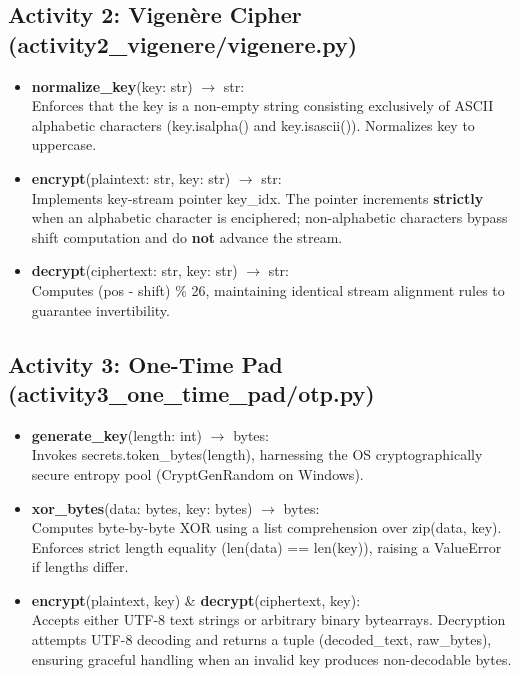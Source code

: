 \documentclass[12pt,a4paper]{report}
\renewcommand{\texttt}[1]{{\normalfont #1}}
\begin{document}
\subsection{Activity 2: Vigen\`ere Cipher (\texttt{activity2\_vigenere/\allowbreak vigenere.py})}
\begin{itemize}[leftmargin=1.5em]
    \item \textbf{\texttt{normalize\_key}}(\texttt{key: str}) $\to$ \texttt{str}:\\[2pt]
    Enforces that the key is a non-empty string consisting exclusively of ASCII alphabetic characters (\texttt{key.isalpha() and key.isascii()}). Normalizes key to uppercase.
    \item \textbf{\texttt{encrypt}}(\texttt{plaintext: str, key: str}) $\to$ \texttt{str}:\\[2pt]
    Implements key-stream pointer \texttt{key\_idx}. The pointer increments \textbf{strictly} when an alphabetic character is enciphered; non-alphabetic characters bypass shift computation and do \textbf{not} advance the stream.
    \item \textbf{\texttt{decrypt}}(\texttt{ciphertext: str, key: str}) $\to$ \texttt{str}:\\[2pt]
    Computes \texttt{(pos - shift) \% 26}, maintaining identical stream alignment rules to guarantee invertibility.
\end{itemize}

\subsection{Activity 3: One-Time Pad (\texttt{activity3\_one\_time\_pad/\allowbreak otp.py})}
\begin{itemize}[leftmargin=1.5em]
    \item \textbf{\texttt{generate\_key}}(\texttt{length: int}) $\to$ \texttt{bytes}:\\[2pt]
    Invokes \texttt{secrets.token\_bytes(length)}, harnessing the OS cryptographically secure entropy pool (CryptGenRandom on Windows).
    \item \textbf{\texttt{xor\_bytes}}(\texttt{data: bytes, key: bytes}) $\to$ \texttt{bytes}:\\[2pt]
    Computes byte-by-byte XOR using a list comprehension over \texttt{zip(data, key)}. Enforces strict length equality (\texttt{len(data) == len(key)}), raising a \texttt{ValueError} if lengths differ.
    \item \textbf{\texttt{encrypt}}(\texttt{plaintext, key}) \& \textbf{\texttt{decrypt}}(\texttt{ciphertext, key}):\\[2pt]
    Accepts either UTF-8 text strings or arbitrary binary bytearrays. Decryption attempts UTF-8 decoding and returns a tuple \texttt{(decoded\_text, raw\_bytes)}, ensuring graceful handling when an invalid key produces non-decodable bytes.
\end{itemize}
\end{document}
